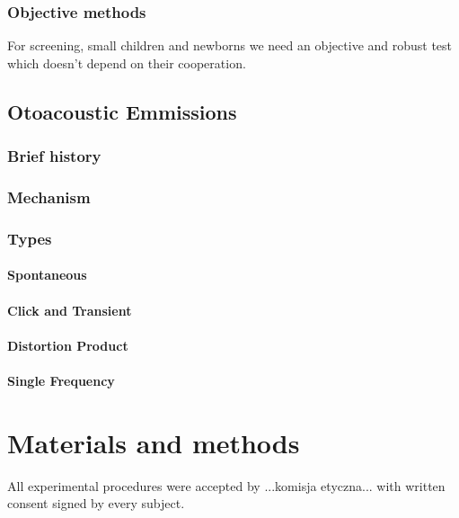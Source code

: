 \documentclass{pracalicmgr}
\begin{document}
    \subsection{Objective methods}
    For screening, small children and newborns we need an objective and robust test which doesn't depend on their cooperation.
      

   \section{Otoacoustic Emmissions}
   \subsection{Brief history}
   \subsection{Mechanism}
   \subsection{Types}
   \subsubsection{Spontaneous}
   \subsubsection{Click and Transient}
   \subsubsection{Distortion Product}
   \subsubsection{Single Frequency}

%
%

	
 
\chapter{Materials and methods}   
 	All experimental procedures  were accepted by ...komisja etyczna... with written consent signed by every subject.
\end{document}
